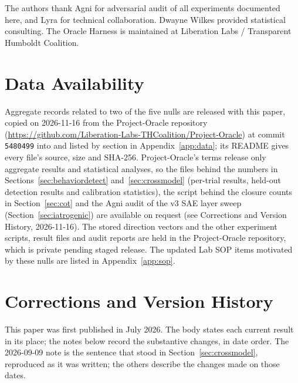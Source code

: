 \documentclass[11pt,letterpaper]{article}
\begin{document}
The authors thank Agni for adversarial audit of all experiments documented here, and Lyra for
technical collaboration. Dwayne Wilkes provided statistical consulting. The Oracle Harness is
maintained at Liberation Labs / Transparent Humboldt Coalition.

\section*{Data Availability}

\begin{sloppypar}
Aggregate records related to two of the five nulls are released with this paper, copied on
2026-11-16 from the Project-Oracle repository
(\url{https://github.com/Liberation-Labs-THCoalition/Project-Oracle}) at commit \texttt{5480499}
into  and listed by section in Appendix~\ref{app:data}; its README gives
every file's source, size and SHA-256. Project-Oracle's terms release only aggregate results and
statistical analyses, so the files behind the numbers in Sections~\ref{sec:behaviordetect}
and~\ref{sec:crossmodel} (per-trial results, held-out detection results and calibration
statistics), the script behind the closure counts in Section~\ref{sec:cot} and the Agni audit of the
v3 SAE layer sweep (Section~\ref{sec:iatrogenic}) are available on request (see Corrections and
Version History, 2026-11-16). The stored direction vectors and the other experiment scripts, result
files and audit reports are held in the Project-Oracle repository, which is private pending staged
release. The updated Lab SOP items motivated by these nulls are listed in Appendix~\ref{app:sop}.
\end{sloppypar}

\section*{Corrections and Version History}\label{sec:corrections}

This paper was first published in July 2026. The body states each current result in its place; the
notes below record the substantive changes, in date order. The 2026-09-09 note is the sentence that
stood in Section~\ref{sec:crossmodel}, reproduced as it was written; the others describe the changes
made on those dates.
\end{document}
